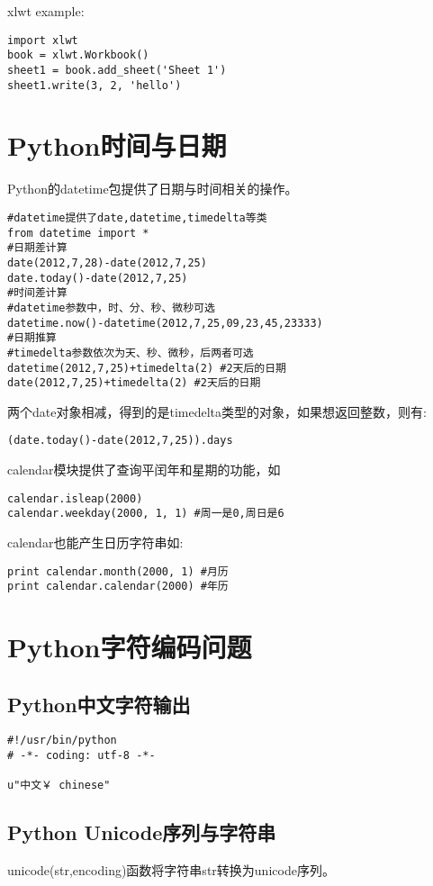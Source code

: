 xlwt example:
\begin{lstlisting}
import xlwt
book = xlwt.Workbook()
sheet1 = book.add_sheet('Sheet 1')
sheet1.write(3, 2, 'hello')
\end{lstlisting}



\section{Python时间与日期} 

Python的datetime包提供了日期与时间相关的操作。
\begin{verbatim}
#datetime提供了date,datetime,timedelta等类
from datetime import * 
#日期差计算
date(2012,7,28)-date(2012,7,25)
date.today()-date(2012,7,25)
#时间差计算
#datetime参数中，时、分、秒、微秒可选
datetime.now()-datetime(2012,7,25,09,23,45,23333)
#日期推算
#timedelta参数依次为天、秒、微秒，后两者可选
datetime(2012,7,25)+timedelta(2) #2天后的日期
date(2012,7,25)+timedelta(2) #2天后的日期
\end{verbatim}

两个date对象相减，得到的是timedelta类型的对象，如果想返回整数，则有:
\begin{verbatim}
(date.today()-date(2012,7,25)).days
\end{verbatim}

calendar模块提供了查询平闰年和星期的功能，如
\begin{verbatim}
calendar.isleap(2000)
calendar.weekday(2000, 1, 1) #周一是0,周日是6
\end{verbatim}
calendar也能产生日历字符串如:
\begin{verbatim}
print calendar.month(2000, 1) #月历
print calendar.calendar(2000) #年历
\end{verbatim}

\label{sec:pythonTimeCalc}


\section{Python字符编码问题}
\subsection{Python中文字符输出}
\begin{verbatim}
#!/usr/bin/python
# -*- coding: utf-8 -*-

u"中文￥ chinese"
\end{verbatim}

\subsection{Python Unicode序列与字符串}
unicode(str,encoding)函数将字符串str转换为unicode序列。


